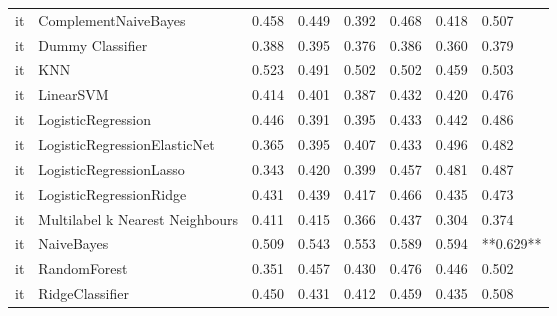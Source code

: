 \begin{tabular}{llllllll}
      it &            ComplementNaiveBayes & 0.458 &                     0.449 &                 0.392 &                  0.468 &                                   0.418 &     0.507 \\
      it &                Dummy Classifier & 0.388 &                     0.395 &                 0.376 &                  0.386 &                                   0.360 &     0.379 \\
      it &                             KNN & 0.523 &                     0.491 &                 0.502 &                  0.502 &                                   0.459 &     0.503 \\
      it &                       LinearSVM & 0.414 &                     0.401 &                 0.387 &                  0.432 &                                   0.420 &     0.476 \\
      it &              LogisticRegression & 0.446 &                     0.391 &                 0.395 &                  0.433 &                                   0.442 &     0.486 \\
      it &    LogisticRegressionElasticNet & 0.365 &                     0.395 &                 0.407 &                  0.433 &                                   0.496 &     0.482 \\
      it &         LogisticRegressionLasso & 0.343 &                     0.420 &                 0.399 &                  0.457 &                                   0.481 &     0.487 \\
      it &         LogisticRegressionRidge & 0.431 &                     0.439 &                 0.417 &                  0.466 &                                   0.435 &     0.473 \\
      it & Multilabel k Nearest Neighbours & 0.411 &                     0.415 &                 0.366 &                  0.437 &                                   0.304 &     0.374 \\
      it &                      NaiveBayes & 0.509 &                     0.543 &                 0.553 &                  0.589 &                                   0.594 & **0.629** \\
      it &                    RandomForest & 0.351 &                     0.457 &                 0.430 &                  0.476 &                                   0.446 &     0.502 \\
      it &                 RidgeClassifier & 0.450 &                     0.431 &                 0.412 &                  0.459 &                                   0.435 &     0.508 \\

\end{tabular}
